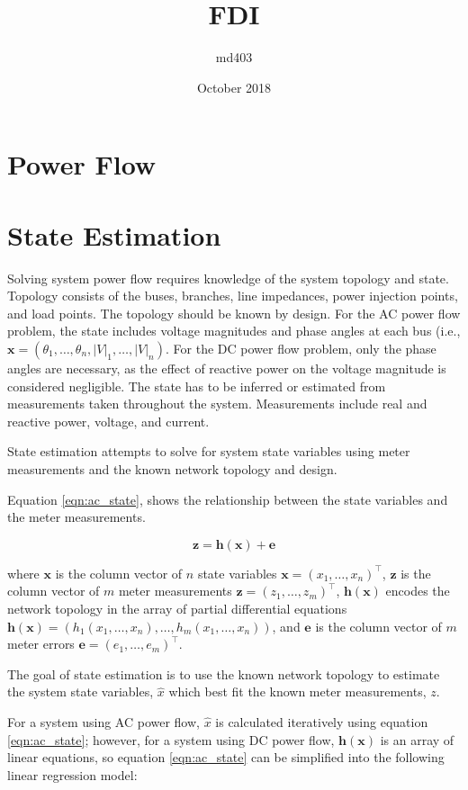 \documentclass{article}
\title{FDI}
\author{md403}
\date{October 2018}
\begin{document}
\section{Power Flow}

\section{State Estimation}

Solving system power flow requires knowledge of the system topology and state.  Topology consists of the buses, branches, line impedances, power injection points, and load points.  The topology should be known by design.  For the AC power flow problem, the state includes voltage magnitudes and phase angles at each bus (i.e., $\mathbf{x} = (\theta_1, \ldots, \theta_n, |V|_1, \ldots, |V|_n)$.  For the DC power flow problem, only the phase angles are necessary, as the effect of reactive power on the voltage magnitude is considered negligible.  The state has to be inferred or estimated from measurements taken throughout the system.  Measurements include real and reactive power, voltage, and current.

State estimation attempts to solve for system state variables using meter measurements and the known network topology and design.

Equation \eqref{eqn:ac_state}, shows the relationship between the state variables and the meter measurements.

\begin{equation}\label{eqn:ac_state}
    \mathbf{z = h(x) + e}
\end{equation}

where $\mathbf{x}$ is the column vector of $n$ state variables $\mathbf{x} = (x_1, \ldots, x_n)^\top$,
$\mathbf{z}$ is the column vector of $m$ meter measurements $\mathbf{z} = (z_1, \ldots, z_m)^\top$,
$\mathbf{h(x)}$ encodes the network topology in the array of partial differential equations $\mathbf{h(x)} = (h_1(x_1, \ldots, x_n), \ldots, h_m(x_1, \ldots, x_n))$, and
$\mathbf{e}$ is the column vector of $m$ meter errors $\mathbf{e} = (e_1, \ldots, e_m)^\top$.

The goal of state estimation is to use the known network topology to estimate the system state variables, $\hat{x}$ which best fit the known meter measurements, $z$.

For a system using AC power flow, $\hat{x}$ is calculated iteratively using equation \eqref{eqn:ac_state}; however, for a system using DC power flow, $\mathbf{h(x)}$ is an array of linear equations, so equation \eqref{eqn:ac_state} can be simplified into the following linear regression model:
\end{document}
